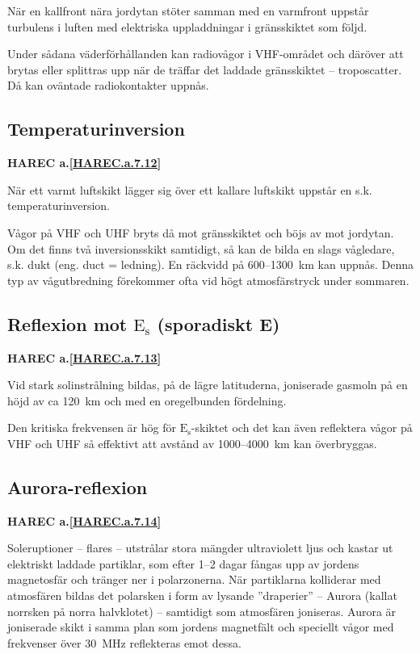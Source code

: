 När en kallfront nära jordytan stöter samman med en varmfront
uppstår turbulens i luften med elektriska uppladdningar i
gränsskiktet som följd.

Under sådana väderförhållanden kan radiovågor i VHF-området och
däröver att brytas eller splittras upp när de träffar det laddade
gränsskiktet -- troposcatter. Då kan oväntade radiokontakter uppnås.

\subsection{Temperaturinversion}
\textbf{
HAREC a.\ref{HAREC.a.7.12}\label{myHAREC.a.7.12}
}

När ett varmt luftskikt lägger sig över ett kallare luftskikt uppstår
en s.k. temperaturinversion.

Vågor på VHF och UHF bryts då mot gränsskiktet och böjs av mot
jordytan. Om det finns två inversionsskikt samtidigt, så kan de bilda
en slags vågledare, s.k. dukt (eng. duct = ledning). En räckvidd på
600--1300~km kan uppnås. Denna typ av vågutbredning förekommer ofta
vid högt atmosfärstryck under sommaren.

\subsection{Reflexion mot $\mathrm{E_s}$ (sporadiskt E)}
\textbf{
HAREC a.\ref{HAREC.a.7.13}\label{myHAREC.a.7.13}
}

Vid stark solinstrålning bildas, på de lägre latituderna, joniserade
gasmoln på en höjd av ca 120~km och med en oregelbunden fördelning.

Den kritiska frekvensen är hög för \(\mathrm{E_s}\)-skiktet och det
kan även reflektera vågor på VHF och UHF så effektivt att avstånd av
1000--4000~km kan överbryggas.

\subsection{Aurora-reflexion}
\textbf{
HAREC a.\ref{HAREC.a.7.14}\label{myHAREC.a.7.14}
}

Soleruptioner -- flares -- utstrålar stora mängder ultraviolett ljus och
kastar ut elektriskt laddade partiklar, som efter 1--2 dagar fångas upp
av jordens magnetosfär och tränger ner i polarzonerna. När partiklarna
kolliderar med atmosfären bildas det polarsken i form av lysande
''draperier'' -- Aurora (kallat norrsken på norra halvklotet) -- samtidigt
som atmosfären joniseras. Aurora är joniserade skikt i samma plan som
jordens magnetfält och speciellt vågor med frekvenser över 30~MHz
reflekteras emot dessa.

